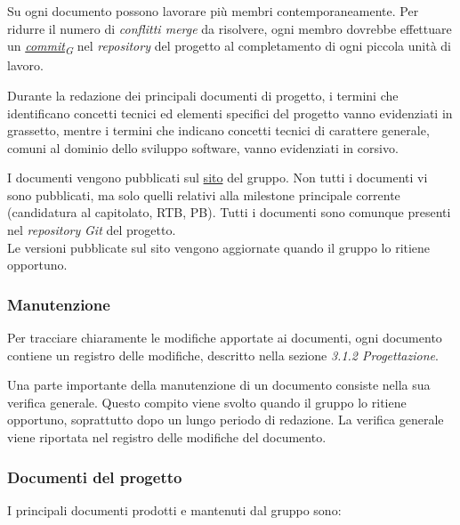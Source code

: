 \documentclass[12pt, a4paper]{article}
\newcommand{\urlglossario}{https://skynetunigroup.github.io/Code_Guardian/Documentazione/PB/glossario_v2.0.0.pdf} %
\newcommand{\glo}[2]{\href{\urlglossario\#nameddest=#2}{#1\textsubscript{G}}}
\begin{document}
Su ogni documento possono lavorare più membri contemporaneamente. Per ridurre il numero di \textit{conflitti merge} da risolvere, ogni membro dovrebbe effettuare un \textit{\glo{commit}{commit}} nel \textit{repository} del progetto al completamento di ogni piccola unità di lavoro.

Durante la redazione dei principali documenti di progetto, i termini che identificano concetti tecnici ed elementi specifici del progetto vanno evidenziati in grassetto, mentre i termini che indicano concetti tecnici di carattere generale, comuni al dominio dello sviluppo software, vanno evidenziati in corsivo.

I documenti vengono pubblicati sul \href{https://skynetunigroup.github.io/Code_Guardian/}{sito} del gruppo. Non tutti i documenti vi sono pubblicati, ma solo quelli relativi alla milestone principale corrente (candidatura al capitolato, RTB, PB). Tutti i documenti sono comunque presenti nel \textit{repository} \textit{Git} del progetto.\\
Le versioni pubblicate sul sito vengono aggiornate quando il gruppo lo ritiene opportuno.

\subsubsection{Manutenzione}

Per tracciare chiaramente le modifiche apportate ai documenti, ogni documento contiene un registro delle modifiche, descritto nella sezione \textit{3.1.2 Progettazione}.

Una parte importante della manutenzione di un documento consiste nella sua verifica generale. Questo compito viene svolto quando il gruppo lo ritiene opportuno, soprattutto dopo un lungo periodo di redazione. La verifica generale viene riportata nel registro delle modifiche del documento.

\subsubsection{Documenti del progetto}

I principali documenti prodotti e mantenuti dal gruppo sono:
\end{document}
